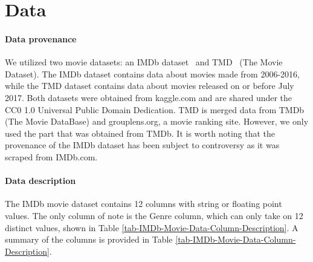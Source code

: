 \section{Data}
    \begin{multicols}{2}
        \paragraph{Data provenance}
            We utilized two movie datasets: an IMDb dataset~\cite{data:IMDb} and
                TMD~\cite{data:TMD} (The Movie Dataset).
            The IMDb dataset contains data about movies made from 2006-2016, while the TMD
                dataset contains data about movies released on or before July 2017.
            Both datasets were obtained from kaggle.com and are shared under the CC0 1.0
                Universal Public Domain Dedication.
            TMD is merged data from TMDb (The Movie DataBase) and grouplens.org, a movie
                ranking site.
            However, we only used the part that was obtained from TMDb.
            It is worth noting that the provenance of the IMDb dataset has been subject to
                controversy as it was scraped from IMDb.com.

        \paragraph{Data description}
            The IMDb movie dataset contains 12 columns with string or floating point
                values.
            The only column of note is the Genre column, which can only take on 12 distinct
                values, shown in Table \ref*{tab-IMDb-Movie-Data-Column-Description}.
            A summary of the columns is provided in Table
                \ref*{tab-IMDb-Movie-Data-Column-Description}.
    \end{multicols}
